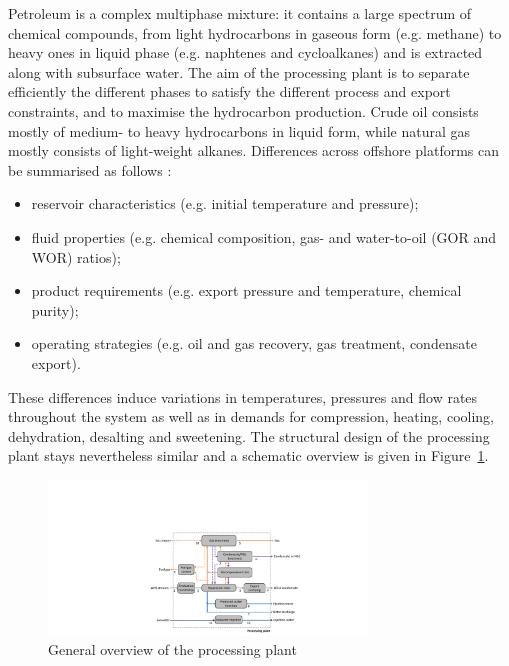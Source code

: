 Petroleum is a complex multiphase mixture: it contains a large spectrum of chemical compounds, from light hydrocarbons in gaseous form (e.g. methane) to heavy ones in liquid phase (e.g. naphtenes and cycloalkanes) and is extracted along with subsurface water. The aim of the processing plant is to separate efficiently the different phases to satisfy the different process and export constraints, and to maximise the hydrocarbon production. Crude oil consists mostly of medium- to heavy hydrocarbons in liquid form, while natural gas mostly consists of light-weight alkanes. Differences across offshore platforms can be summarised as follows \cite{Bothamley2004,Energistyrelsen2011,NorwegianMinistryofPetroleumandEnergy2012,JonesDavidS.J.Stan;Pujado2006,Manning1991,Plisga2004,Abdel-AalH.K.;AggourMohamed;Fahim2003,VikEilanArctander;Dinning2009}: 

\begin{itemize}
	\item reservoir characteristics (e.g. initial temperature and pressure);
	\item fluid properties (e.g. chemical composition, gas- and water-to-oil (GOR and WOR) ratios);
	\item product requirements (e.g. export pressure and temperature, chemical purity);
	\item operating strategies (e.g. oil and gas recovery, gas treatment, condensate export).
\end{itemize}
These differences induce variations in temperatures, pressures and flow rates throughout the system as well as in demands for compression, heating, cooling, dehydration, desalting and sweetening. The structural design of the processing plant stays nevertheless similar and a schematic overview is given in Figure~\ref{fig:processing_plant}.

\begin{figure}[htbp]
	\centering
	\includegraphics[width=0.75\textwidth]{general_process_overview.pdf}
	\caption{General overview of the processing plant}
	\label{fig:processing_plant}
\end{figure}

